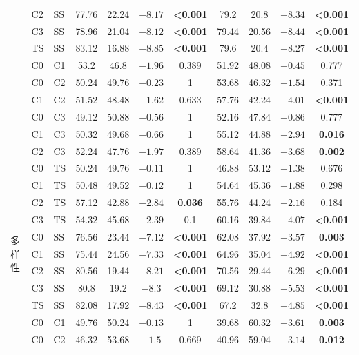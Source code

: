 \documentclass[11pt,UTF8,fontset=fandol]{ctexart}
\begin{document}
\begin{center}
\begin{longtable}{@{}lll cccc cccc@{}}
 & C2 & SS & 77.76 & 22.24 & $-8.17$ & \textbf{<0.001} & 79.2 & 20.8 & $-8.34$ & \textbf{<0.001} \\
 & C3 & SS & 78.96 & 21.04 & $-8.12$ & \textbf{<0.001} & 79.44 & 20.56 & $-8.44$ & \textbf{<0.001} \\
 & TS & SS & 83.12 & 16.88 & $-8.85$ & \textbf{<0.001} & 79.6 & 20.4 & $-8.27$ & \textbf{<0.001} \\
 & C0 & C1 & 53.2 & 46.8 & $-1.96$ & 0.389 & 51.92 & 48.08 & $-0.45$ & 0.777 \\
 & C0 & C2 & 50.24 & 49.76 & $-0.23$ & 1 & 53.68 & 46.32 & $-1.54$ & 0.371 \\
 & C1 & C2 & 51.52 & 48.48 & $-1.62$ & 0.633 & 57.76 & 42.24 & $-4.01$ & \textbf{<0.001} \\
 & C0 & C3 & 49.12 & 50.88 & $-0.56$ & 1 & 52.16 & 47.84 & $-0.86$ & 0.777 \\
 & C1 & C3 & 50.32 & 49.68 & $-0.66$ & 1 & 55.12 & 44.88 & $-2.94$ & \textbf{0.016} \\
 & C2 & C3 & 52.24 & 47.76 & $-1.97$ & 0.389 & 58.64 & 41.36 & $-3.68$ & \textbf{0.002} \\
\midrule
\multirow{15}{*}{多样性}
 & C0 & TS & 50.24 & 49.76 & $-0.11$ & 1 & 46.88 & 53.12 & $-1.38$ & 0.676 \\
 & C1 & TS & 50.48 & 49.52 & $-0.12$ & 1 & 54.64 & 45.36 & $-1.88$ & 0.298 \\
 & C2 & TS & 57.12 & 42.88 & $-2.84$ & \textbf{0.036} & 55.76 & 44.24 & $-2.16$ & 0.184 \\
 & C3 & TS & 54.32 & 45.68 & $-2.39$ & 0.1 & 60.16 & 39.84 & $-4.07$ & \textbf{<0.001} \\
 & C0 & SS & 76.56 & 23.44 & $-7.12$ & \textbf{<0.001} & 62.08 & 37.92 & $-3.57$ & \textbf{0.003} \\
 & C1 & SS & 75.44 & 24.56 & $-7.33$ & \textbf{<0.001} & 64.96 & 35.04 & $-4.92$ & \textbf{<0.001} \\
 & C2 & SS & 80.56 & 19.44 & $-8.21$ & \textbf{<0.001} & 70.56 & 29.44 & $-6.29$ & \textbf{<0.001} \\
 & C3 & SS & 80.8 & 19.2 & $-8.3$ & \textbf{<0.001} & 69.12 & 30.88 & $-5.53$ & \textbf{<0.001} \\
 & TS & SS & 82.08 & 17.92 & $-8.43$ & \textbf{<0.001} & 67.2 & 32.8 & $-4.85$ & \textbf{<0.001} \\
 & C0 & C1 & 49.76 & 50.24 & $-0.13$ & 1 & 39.68 & 60.32 & $-3.61$ & \textbf{0.003} \\
 & C0 & C2 & 46.32 & 53.68 & $-1.5$ & 0.669 & 40.96 & 59.04 & $-3.14$ & \textbf{0.012} \\

\end{longtable}
\end{center}
\end{document}

